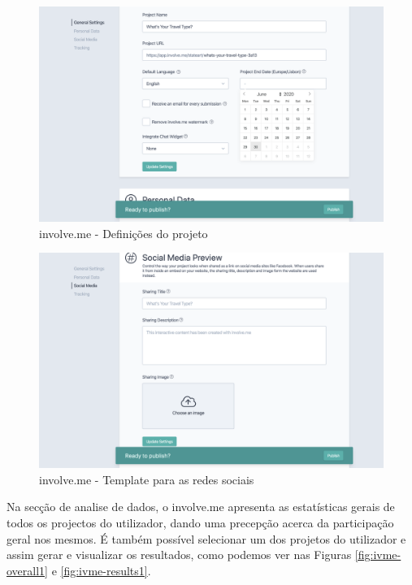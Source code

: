 \begin{figure}[ht!]
	\begin{center}
		\includegraphics[width=1\textwidth]{img/ivme/project}
		\caption{involve.me - Definições do projeto}
		\label{fig:ivme-project}
	\end{center}
\end{figure}

\begin{figure}[ht!]
	\begin{center}
		\includegraphics[width=1\textwidth]{img/ivme/social}
		\caption{involve.me - Template para as redes sociais}
		\label{fig:ivme-social}
	\end{center}
\end{figure}


Na secção de analise de dados, o involve.me apresenta as estatísticas gerais de todos os projectos do utilizador, dando uma precepção acerca da participação geral nos mesmos. É também possível selecionar um dos projetos do utilizador e assim gerar e visualizar os resultados, como podemos ver nas Figuras \ref{fig:ivme-overall1} e \ref{fig:ivme-results1}.

